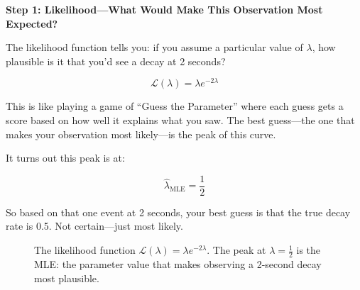\vspace{0.5em}
\noindent
\textbf{Step 1: Likelihood—What Would Make This Observation Most Expected?}

The likelihood function tells you: if you assume a particular value of \( \lambda \), how plausible is it that you’d see a decay at 2 seconds?

\[
\mathcal{L}(\lambda) = \lambda e^{-2\lambda}
\]

This is like playing a game of “Guess the Parameter” where each guess gets a score based on how well it explains what you saw. The best guess—the one that makes your observation most likely—is the peak of this curve.

It turns out this peak is at:

\[
\hat{\lambda}_{\text{MLE}} = \frac{1}{2}
\]

So based on that one event at 2 seconds, your best guess is that the true decay rate is 0.5. Not certain—just most likely.


\begin{figure}[H]
\centering
{}
\caption{The likelihood function \( \mathcal{L}(\lambda) = \lambda e^{-2\lambda} \). The peak at \( \lambda = \frac{1}{2} \) is the MLE: the parameter value that makes observing a 2-second decay most plausible.}
\end{figure}




